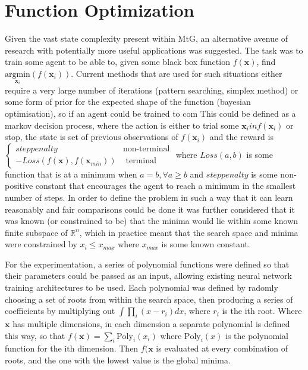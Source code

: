 \section{Function Optimization}
Given the vast state complexity present within MtG, an alternative avenue of research with potentially more useful applications was suggested. The task was to train some agent to be able to, given some black box function $f(\boldsymbol{x})$, find $\underset{\boldsymbol{x}_i}{\text{argmin}} (f(\boldsymbol{x}_i))$. Current methods that are used for such situations either require a very large number of iterations (pattern searching, simplex method) or some form of prior for the expected shape of the function (bayesian optimisation), so if an agent could be trained to com
This could be defined as  a markov decision process, where the action is either to trial some $\boldsymbol{x}_i in f(\boldsymbol{x}_i)$ or stop, the state is set of previous observations of $f(\boldsymbol{x}_i)$ and the reward is $\begin{cases}
 step penalty&  \text{non-terminal} \\
-Loss(f(\boldsymbol{x}), f(\boldsymbol{x}_{min})) & \text{ terminal}
\end{cases} $ where $Loss(a,b)$ is some function that is at a minimum when $a = b, \forall a \geq b$ and $step penalty$ is some non-positive constant that encourages the agent to reach a minimum in the smallest number of steps. 
In order to define the problem in such a way that it can learn reasonably and fair comparisons could be done it was further considered that it was known (or constrained to be) that the minima would lie within some known finite subspace of $\mathbb{R}^n$, which in practice meant that the search space and minima were constrained by $x_i \leq x_{max}$ where $x_{max}$ is some known constant.

For the experimentation, a series of polynomial functions were defined so that their parameters could be passed as an input, allowing existing neural network training architectures to be used. Each polynomial was defined by radomly choosing a set of roots from within the search space, then producing a series of coefficients by multiplying out
$\int \prod_i (x - r_i) dx$, where $r_i$ is the ith root. Where $\boldsymbol{x}$ has multiple dimensions, in each dimension a separate polynomial is defined this way, so that $f(\boldsymbol{x})  = \sum_i \text{Poly}_i(x_i)$ where $\text{Poly}_i(x)$ is the polynomial function for the ith dimension. Then $f(\boldsymbol{x}$ is evaluated at every combination of roots, and the one with the lowest value is the global minima.

